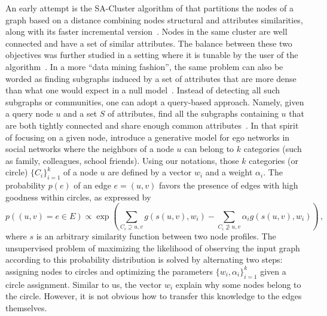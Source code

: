An early attempt is the \textsf{SA-Cluster} algorithm of \textcite{Zhou2009} that partitions the
nodes of a graph based on a distance combining nodes structural and attributes similarities, along
with its faster incremental version~\autocite{Zhou2010}. Nodes in the same cluster are well
connected and have a set of similar attributes. The balance between these two objectives was further
studied in a setting where it is tunable by the user of the algorithm~\autocite{Baroni2017}. In a
more \enquote{data mining fashion}, the same problem can also be worded as finding subgraphs induced
by a set of attributes that are more dense than what one would expect in a null
model~\autocite{Silva2012}. Instead of detecting all such subgraphs or communities, one can adopt a
query-based approach. Namely, given a query node $u$ and a set $S$ of attributes, find all the
subgraphs containing $u$ that are both tightly connected and share enough common
attributes~\autocite{AttributedCommunity16}. In that spirit of focusing on a given node,
\textcite{LeskovecEgo12} introduce a generative model for ego networks in social networks where the
neighbors of a node $u$ can belong to $k$ categories (such as family, colleagues, school friends).
Using our notations, those $k$ categories (or circle) $\{C_i\}_{i=1}^k$ of a node $u$ are defined by
a vector $w_i$ and a weight $\alpha_i$. The probability $p(e)$ of an edge $e=(u,v)$ favors the
presence of edges with high goodness within circles, as expressed by
\begin{equation}
  \label{eq:edge_ego}
  p((u, v)=e \in E) \propto \exp \left(
    \sum_{C_i  \supseteq {u,v}} g(s(u,v), w_i) -
    \sum_{C_i \nsupseteq {u,v}} \alpha_i g(s(u,v), w_i)
  \right) \,,%
\end{equation}
where $s$ is an arbitrary similarity function between two node profiles.
The unsupervised problem of maximizing the likelihood of observing the input graph according to this
probability distribution is solved by alternating two steps: assigning nodes to circles and
optimizing the parameters $\{w_i, \alpha_i\}_{i=1}^k$ given a circle assignment. Similar to us, the
vector $w_i$ explain why some nodes belong to the \ith{} circle. However, it is not obvious how to
transfer this knowledge to the edges themselves.

